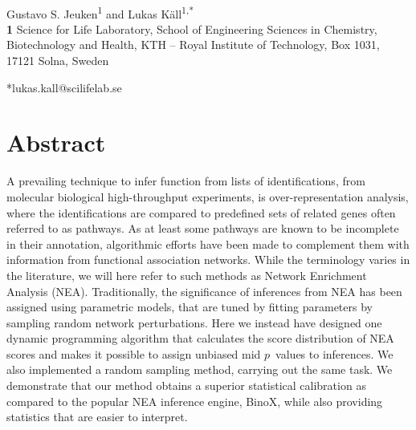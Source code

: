 \documentclass[10pt,letterpaper]{article}
\begin{document}
\vspace*{0.2in}

\begin{flushleft}
{\Large
\textbf{} %
}
\newline
\\
Gustavo S. Jeuken\textsuperscript{1} and
Lukas K\"{a}ll\textsuperscript{1,*}
\\
\bigskip
\textbf{1} Science for Life Laboratory, School of Engineering Sciences in Chemistry, Biotechnology and Health, KTH -- Royal Institute of Technology, Box 1031, 17121 Solna, Sweden
\\
\bigskip

*lukas.kall@scilifelab.se
\end{flushleft}
\section*{Abstract}
A prevailing technique to infer function from lists of identifications, from molecular biological high-throughput experiments, is over-representation analysis, where the identifications are compared to predefined sets of related genes often referred to as pathways. As at least some pathways are known to be incomplete in their annotation, algorithmic efforts have been made to complement them with information from functional association networks. While the terminology varies in the literature, we will here refer to such methods as Network Enrichment Analysis (NEA). Traditionally, the significance of inferences from NEA has been assigned using parametric models, that are tuned by fitting parameters by sampling random network perturbations. Here we instead have designed one dynamic programming algorithm that calculates the score distribution of NEA scores and makes it possible to assign unbiased mid $p$~values to inferences. We also implemented a random sampling method, carrying out the same task. We demonstrate that our method obtains a superior statistical calibration as compared to the popular NEA inference engine, BinoX, while also providing statistics that are easier to interpret.
\end{document}
